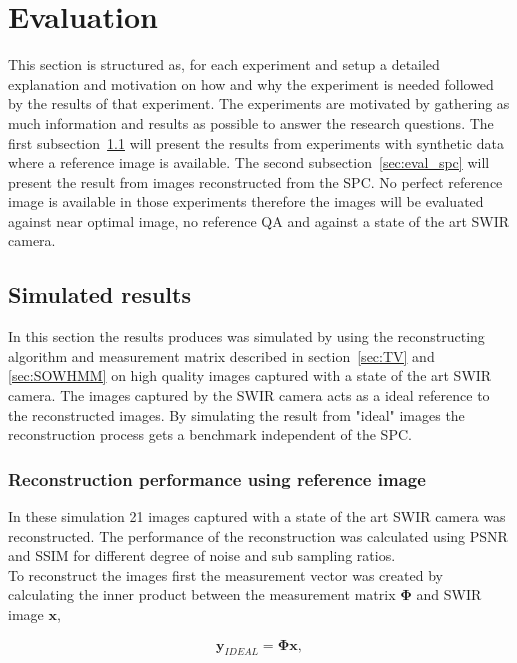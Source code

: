 \section{Evaluation}
\label{sec:Evaluation}
This section is structured as, for each experiment and setup a detailed explanation and motivation on how and why the experiment is needed followed by the results of that experiment. The experiments are motivated by gathering as much information and results as possible to answer the research questions. The first subsection~\ref{sec:simulated_results} will present the results from experiments with synthetic data where a reference image is available. The second subsection~\ref{sec:eval_spc} will present the result from images reconstructed from the SPC. No perfect reference image is available in those experiments therefore the images will be evaluated against near optimal image, no reference QA and against a state of the art SWIR camera. 



\subsection{Simulated results}
\label{sec:simulated_results}
In this section the results produces was simulated by using the reconstructing algorithm and measurement matrix described in section~\ref{sec:TV} and \ref{sec:SOWHMM} on high quality images captured with a state of the art SWIR camera. The images captured by the SWIR camera acts as a ideal reference to the reconstructed images. By simulating the result from "ideal" images the reconstruction process gets a benchmark independent of the SPC.


\subsubsection{Reconstruction performance using reference image}
\label{sec:reconstruction_performance}
In these simulation 21 images captured with a state of the art SWIR camera was reconstructed. The performance of the reconstruction was calculated using PSNR and SSIM for different degree of noise and sub sampling ratios.\\[0.1in]

To reconstruct the images first the measurement vector was created by calculating the inner product between the measurement matrix ${\mathbf{\Phi}}$ and SWIR image $\mathbf{x}$,

\begin{equation}
\mathbf{y}_{IDEAL} = \mathbf{\Phi}\mathbf{x},
\end{equation}  


